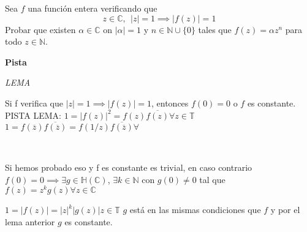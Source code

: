 \begin{ejer}
	Sea $f$ una función entera verificando que
	$$ z\in\mathbb{C}, \ \ |z|=1 \implies |f(z)|=1 $$
	Probar que existen $\alpha\in\mathbb{C}$ on $|\alpha|=1$ y $n\in\mathbb{N}\cup \{0\}$ tales que $f(z) = \alpha z^n$ para todo $z\in\mathbb{N}$.
\end{ejer}
\begin{sol}

\textbf{Pista}

\textit{LEMA}

Si f verifica que $|z|=1 \implies |f(z)|=1$, entonces $f(0)=0$ o $f$ es constante.
PISTA LEMA:
$1=|f(z)|^2 = f(z)\overline{f(z)} \forall z\in\mathbb{T}$ 
$1= f(\overline{z})\overline{f(\overline{z})} = f(1/z)\overline{f(\overline{z})}\forall $ 

\

Si hemos probado eso y f es constante es trivial, en caso contrario
$f(0)=0 \implies \exists g\in\mathbb{H}(\mathbb{C})$, $\exists k\in\mathbb{N}$ con $g(0) \not =0$ tal que
$f(z) = z^kg(z) \forall z\in\mathbb{C}$

$1=|f(z)| = |z|^k|g(z)| z\in\mathbb{T}$
$g$ está en las mismas condiciones que $f$ y por el lema anterior $g$ es constante.
\end{sol}